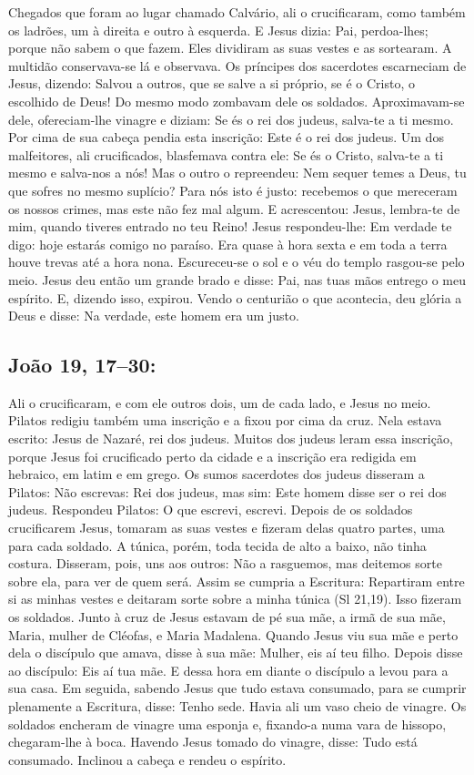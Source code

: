 \documentclass[10pt,a5paper]{book}
\newcommand{\from}[1]{\subsection*{#1}}
\begin{document}
Chegados que foram ao lugar chamado Calvário, ali o crucificaram, como também os ladrões, um à direita e outro à esquerda.
E Jesus dizia: Pai, perdoa-lhes; porque não sabem o que fazem. Eles dividiram as suas vestes e as sortearam.
A multidão conservava-se lá e observava. Os príncipes dos sacerdotes escarneciam de Jesus, dizendo: Salvou a outros, que se salve a si próprio, se é o Cristo, o escolhido de Deus!
Do mesmo modo zombavam dele os soldados. Aproximavam-se dele, ofereciam-lhe vinagre e diziam:
Se és o rei dos judeus, salva-te a ti mesmo.
Por cima de sua cabeça pendia esta inscrição: Este é o rei dos judeus.
Um dos malfeitores, ali crucificados, blasfemava contra ele: Se és o Cristo, salva-te a ti mesmo e salva-nos a nós!
Mas o outro o repreendeu: Nem sequer temes a Deus, tu que sofres no mesmo suplício?
Para nós isto é justo: recebemos o que mereceram os nossos crimes, mas este não fez mal algum.
E acrescentou: Jesus, lembra-te de mim, quando tiveres entrado no teu Reino!
Jesus respondeu-lhe: Em verdade te digo: hoje estarás comigo no paraíso.
Era quase à hora sexta e em toda a terra houve trevas até a hora nona.
Escureceu-se o sol e o véu do templo rasgou-se pelo meio.
Jesus deu então um grande brado e disse: Pai, nas tuas mãos entrego o meu espírito. E, dizendo isso, expirou.
Vendo o centurião o que acontecia, deu glória a Deus e disse: Na verdade, este homem era um justo.

\from{João 19, 17--30:}

Ali o crucificaram, e com ele outros dois, um de cada lado, e Jesus no meio.
Pilatos redigiu também uma inscrição e a fixou por cima da cruz. Nela estava escrito: Jesus de Nazaré, rei dos judeus.
Muitos dos judeus leram essa inscrição, porque Jesus foi crucificado perto da cidade e a inscrição era redigida em hebraico, em latim e em grego.
Os sumos sacerdotes dos judeus disseram a Pilatos: Não escrevas: Rei dos judeus, mas sim: Este homem disse ser o rei dos judeus.
Respondeu Pilatos: O que escrevi, escrevi.
Depois de os soldados crucificarem Jesus, tomaram as suas vestes e fizeram delas quatro partes, uma para cada soldado. A túnica, porém, toda tecida de alto a baixo, não tinha costura.
Disseram, pois, uns aos outros: Não a rasguemos, mas deitemos sorte sobre ela, para ver de quem será. Assim se cumpria a Escritura: Repartiram entre si as minhas vestes e deitaram sorte sobre a minha túnica (Sl 21,19). Isso fizeram os soldados.
Junto à cruz de Jesus estavam de pé sua mãe, a irmã de sua mãe, Maria, mulher de Cléofas, e Maria Madalena.
Quando Jesus viu sua mãe e perto dela o discípulo que amava, disse à sua mãe: Mulher, eis aí teu filho.
Depois disse ao discípulo: Eis aí tua mãe. E dessa hora em diante o discípulo a levou para a sua casa.
Em seguida, sabendo Jesus que tudo estava consumado, para se cumprir plenamente a Escritura, disse: Tenho sede.
Havia ali um vaso cheio de vinagre. Os soldados encheram de vinagre uma esponja e, fixando-a numa vara de hissopo, chegaram-lhe à boca.
Havendo Jesus tomado do vinagre, disse: Tudo está consumado. Inclinou a cabeça e rendeu o espírito.
\end{document}
